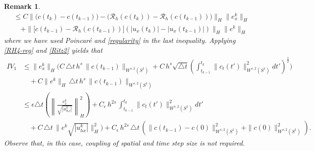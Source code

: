 \documentclass[a4paper,10pt]{article}
\newtheorem{rem}[cor]{Remark}
\numberwithin{equation}{section}
\begin{document}
\begin{rem}
\begin{align*}
&\leq C\|\big( c(t_{k}) - c(t_{k-1})\big) -\big(\mathcal{R}_{h}(c(t_{k})) - \mathcal{R}_{h}(c(t_{k-1})) \big) \|_{H} \| e^{k}_{x}\|_{H}\\
&\quad+
\| \Big[ c(t_{k-1}) - \mathcal{R}_{h}(c(t_{k-1})) \Big](|u_{x}(t_{k})|- |u_{x}(t_{k-1})|) \|_{H} \| e^{k}\|_{H}
\end{align*}
where we have used Poincar\'{e} and \eqref{regularity} in the last inequality.
Applying \eqref{RH4-reg} and \eqref{Ritz2} yields that
\begin{align*}
IV_{1} & \leq \| e^{k}_{x} \|_{H} \Big(C \, \triangle t \, h^{s} \, \| c(t_{k-1}) \|_{W^{s,2}(S^{1})} + C \, h^{s} \sqrt{\triangle t} (\int_{t_{k-1}}^{t_{k}}\| c_{t}(t') \|_{W^{s,2}(S^{1})}^{2} dt')^{\frac{1}{2}} \Big)\\
& \quad + C \| e^{k} \|_{H} \, \triangle t \, h^{s} \, \| c(t_{k-1}) \|_{W^{s,2}(S^{1})} \\
& \leq \epsilon \triangle t\left (\left \| \frac{e_{x}^{k}}{\sqrt{|u^{k}_{hx}| } } \right \| ^{2}_{H} \right) + C_{\epsilon} \, h^{2s} \, \int_{t_{k-1}}^{t_{k}}\| c_{t}(t') \|_{W^{s,2}(S^{1})}^{2} dt' \\
& \quad + C \, \triangle t \, \| e^{k} \sqrt{|u^{k}_{hx}|} \|^{2}_{H}) + C_{\epsilon} \, h^{2s} \, \triangle t \, 
( \| c(t_{k-1}) - c(0)\|_{W^{s,2}(S^{1})}^{2} +\| c(0)\|_{W^{s,2}(S^{1})}^{2}).
\end{align*}
Observe that, in this case, coupling of spatial and time step size is not required.
\end{rem}
\end{document}
